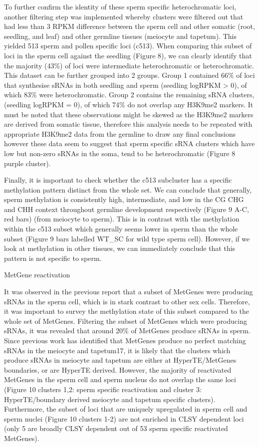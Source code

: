 To further confirm the identity of these sperm specific heterochromatic loci, another filtering step was implemented whereby clusters were filtered out that had less than 3 RPKM difference between the sperm cell and other somatic (root, seedling, and leaf) and other germline tissues (meiocyte and tapetum). This yielded 513 sperm and pollen specific loci (c513). When comparing this subset of loci in the sperm cell against the seedling (Figure 8), we can clearly identify that the majority (43\%) of loci were intermediate heterochromatic or heterochromatic. This dataset can be further grouped into 2 groups. Group 1 contained 66\% of loci that synthesise sRNAs in both seedling and sperm (seedling logRPKM > 0), of which 83\% were heterochromatic. Group 2 contains the remaining sRNA clusters, (seedling logRPKM = 0), of which 74\% do not overlap any H3K9me2 markers. It must be noted that these observations might be skewed as the H3K9me2 markers are derived from somatic tissue, therefore this analysis needs to be repeated with appropriate H3K9me2 data from the germline to draw any final conclusions however these data seem to suggest that sperm specific sRNA clusters which have low but non-zero sRNAs in the soma, tend to be heterochromatic (Figure 8 purple cluster).
 

Finally, it is important to check whether the c513 subcluster has a specific methylation pattern distinct from the whole set. We can conclude that generally, sperm methylation is consistently high, intermediate, and low in the CG CHG and CHH context throughout germline development respectively (Figure 9 A-C, red bars) (from meiocyte to sperm). This is in contrast with the methylation within the c513 subset which generally seems lower in sperm than the whole subset (Figure 9 bars labelled WT\_SC for wild type sperm cell). However, if we look at methylation in other tissues, we can immediately conclude that this pattern is not specific to sperm.

MetGene reactivation

It was observed in the previous report that a subset of MetGenes were producing sRNAs in the sperm cell, which is in stark contrast to other sex cells. Therefore, it was important to survey the methylation state of this subset compared to the whole set of MetGenes. Filtering the subset of MetGenes which were producing sRNAs, it was revealed that around 20\% of MetGenes produce sRNAs in sperm. Since previous work has identified that MetGenes produce no perfect matching sRNAs in the meiocyte and tapetum17, it is likely that the clusters which produce sRNAs in meiocyte and tapetum are either at HyperTE/MetGenes boundaries, or are HyperTE derived. However, the majority of reactivated MetGenes in the sperm cell and sperm nucleus do not overlap the same loci (Figure 10 clusters 1,2: sperm specific reactivation and cluster 3: HyperTE/boundary derived meiocyte and tapetum specific clusters). Furthermore, the subset of loci that are uniquely upregulated in sperm cell and sperm nuclei (Figure 10 clusters 1-2) are not enriched in CLSY dependent loci (only 5 are broadly CLSY dependent out of 53 sperm specific reactivated MetGenes).

